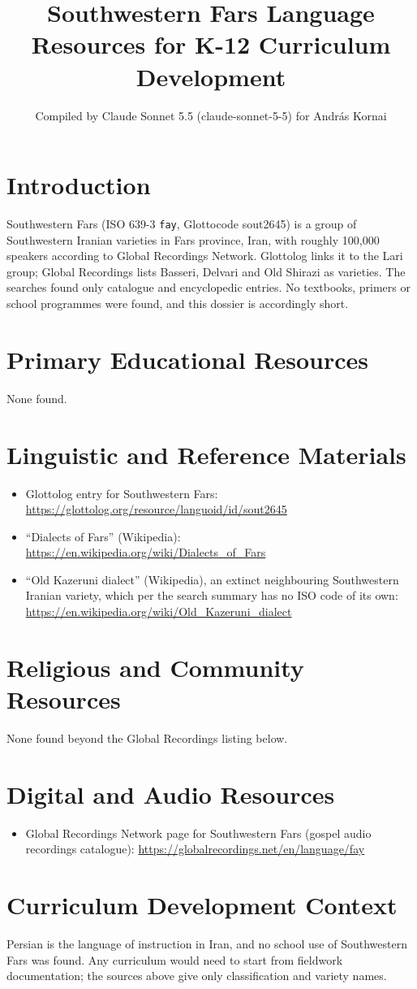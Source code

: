 \documentclass[12pt]{article}
\title{Southwestern Fars Language Resources for K-12 Curriculum Development}
\author{Compiled by Claude Sonnet 5.5 (claude-sonnet-5-5) for Andr\'as Kornai}
\date{}
\begin{document}
\maketitle

\section{Introduction}
Southwestern Fars (ISO 639-3 \texttt{fay}, Glottocode sout2645) is a group of Southwestern Iranian varieties in Fars province, Iran, with roughly 100,000 speakers according to Global Recordings Network. Glottolog links it to the Lari group; Global Recordings lists Basseri, Delvari and Old Shirazi as varieties. The searches found only catalogue and encyclopedic entries. No textbooks, primers or school programmes were found, and this dossier is accordingly short.

\section{Primary Educational Resources}
None found.

\section{Linguistic and Reference Materials}
\begin{itemize}
\item Glottolog entry for Southwestern Fars: \url{https://glottolog.org/resource/languoid/id/sout2645}
\item ``Dialects of Fars'' (Wikipedia): \url{https://en.wikipedia.org/wiki/Dialects_of_Fars}
\item ``Old Kazeruni dialect'' (Wikipedia), an extinct neighbouring Southwestern Iranian variety, which per the search summary has no ISO code of its own: \url{https://en.wikipedia.org/wiki/Old_Kazeruni_dialect}
\end{itemize}

\section{Religious and Community Resources}
None found beyond the Global Recordings listing below.

\section{Digital and Audio Resources}
\begin{itemize}
\item Global Recordings Network page for Southwestern Fars (gospel audio recordings catalogue): \url{https://globalrecordings.net/en/language/fay}
\end{itemize}

\section{Curriculum Development Context}
Persian is the language of instruction in Iran, and no school use of Southwestern Fars was found. Any curriculum would need to start from fieldwork documentation; the sources above give only classification and variety names.
\end{document}
